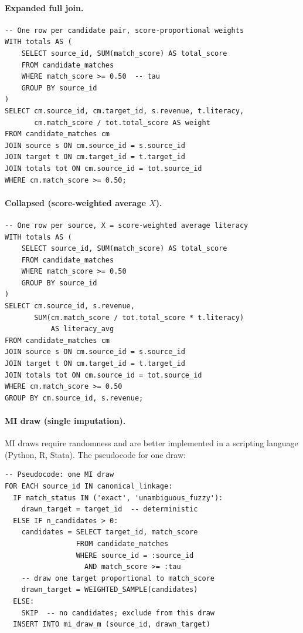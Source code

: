 \documentclass[12pt]{article}
\begin{document}
\paragraph{Expanded full join.}

\begin{lstlisting}[style=sql]
-- One row per candidate pair, score-proportional weights
WITH totals AS (
    SELECT source_id, SUM(match_score) AS total_score
    FROM candidate_matches
    WHERE match_score >= 0.50  -- tau
    GROUP BY source_id
)
SELECT cm.source_id, cm.target_id, s.revenue, t.literacy,
       cm.match_score / tot.total_score AS weight
FROM candidate_matches cm
JOIN source s ON cm.source_id = s.source_id
JOIN target t ON cm.target_id = t.target_id
JOIN totals tot ON cm.source_id = tot.source_id
WHERE cm.match_score >= 0.50;
\end{lstlisting}

\paragraph{Collapsed (score-weighted average $X$).}

\begin{lstlisting}[style=sql]
-- One row per source, X = score-weighted average literacy
WITH totals AS (
    SELECT source_id, SUM(match_score) AS total_score
    FROM candidate_matches
    WHERE match_score >= 0.50
    GROUP BY source_id
)
SELECT cm.source_id, s.revenue,
       SUM(cm.match_score / tot.total_score * t.literacy)
           AS literacy_avg
FROM candidate_matches cm
JOIN source s ON cm.source_id = s.source_id
JOIN target t ON cm.target_id = t.target_id
JOIN totals tot ON cm.source_id = tot.source_id
WHERE cm.match_score >= 0.50
GROUP BY cm.source_id, s.revenue;
\end{lstlisting}

\paragraph{MI draw (single imputation).}
MI draws require randomness and are better implemented in a scripting language (Python, R, Stata). The pseudocode for one draw:

\begin{lstlisting}[style=sql]
-- Pseudocode: one MI draw
FOR EACH source_id IN canonical_linkage:
  IF match_status IN ('exact', 'unambiguous_fuzzy'):
    drawn_target = target_id  -- deterministic
  ELSE IF n_candidates > 0:
    candidates = SELECT target_id, match_score
                 FROM candidate_matches
                 WHERE source_id = :source_id
                   AND match_score >= :tau
    -- draw one target proportional to match_score
    drawn_target = WEIGHTED_SAMPLE(candidates)
  ELSE:
    SKIP  -- no candidates; exclude from this draw
  INSERT INTO mi_draw_m (source_id, drawn_target)
\end{lstlisting}
\end{document}
